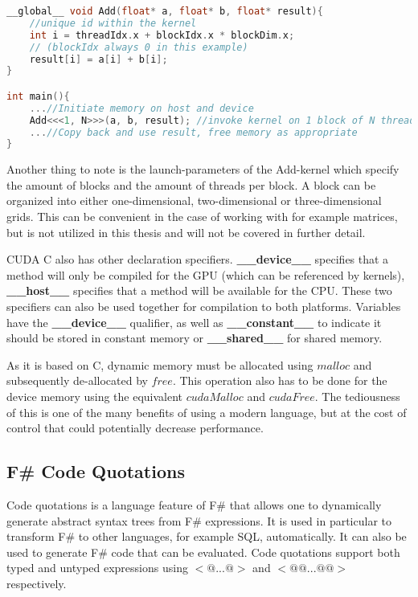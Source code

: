 {\begin{lstlisting}[language=C++, caption=CUDA C addition kernel, label=cuda_add]
__global__ void Add(float* a, float* b, float* result){
	//unique id within the kernel
	int i = threadIdx.x + blockIdx.x * blockDim.x;
	// (blockIdx always 0 in this example)
	result[i] = a[i] + b[i];
}

int main(){
	...//Initiate memory on host and device
	Add<<<1, N>>>(a, b, result); //invoke kernel on 1 block of N threads
	...//Copy back and use result, free memory as appropriate
}
\end{lstlisting}

Another thing to note is the launch-parameters of the Add-kernel which specify the amount of blocks and the amount of threads per block. A block can be organized into either one-dimensional, two-dimensional or three-dimensional grids. This can be convenient in the case of working with for example matrices, but is not utilized in this thesis and will not be covered in further detail.

CUDA C also has other declaration specifiers. \textbf{\_\_device\_\_} specifies that a method will only be compiled for the GPU (which can be referenced by kernels), \textbf{\_\_host\_\_} specifies that a method will be available for the CPU. These two specifiers can also be used together for compilation to both platforms.
Variables have the \textbf{\_\_device\_\_} qualifier, as well as \textbf{\_\_constant\_\_} to indicate it should be stored in constant memory or \textbf{\_\_shared\_\_} for shared memory.

As it is based on C, dynamic memory must be allocated using $malloc$ and subsequently de-allocated by $free$.
This operation also has to be done for the device memory using the equivalent $cudaMalloc$ and $cudaFree$.
The tediousness of this is one of the many benefits of using a modern language, but at the cost of control that could potentially decrease performance.

\subsection{F\# Code Quotations}
Code quotations is a language feature of F\# that allows one to dynamically generate abstract syntax trees from F\# expressions. It is used in particular to transform F\# to other languages, for example SQL, automatically. It can also be used to generate F\# code that can be evaluated. Code quotations support both typed and untyped expressions using $<@ ... @>$ and $<@@ ... @@>$ respectively.

}
